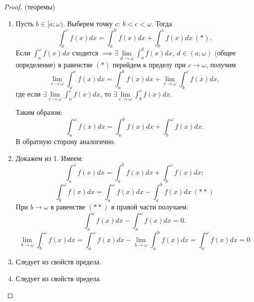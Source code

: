 \documentclass{report}
\theoremstyle{definition}
\begin{document}
\begin{proof}
  (теоремы)

  \begin{enumerate}
    \item Пусть $b \in [a;\omega)$. Выберем точку $c: \ b<c<\omega$. Тогда
          \begin{equation*}
            \int_{a}^{c}f(x)dx = \int_{a}^{b}f(x)dx + \int_{b}^{c}f(x)dx \ (*).
          \end{equation*}
          Если $\int_{a}^{\omega}f(x)dx$ сходится $\implies \exists \underset{d\rightarrow\omega}{\lim}\int_{a}^{d}
            f(x)dx, \ d\in(a;\omega)$ (общее определение) в равенстве $(*)$ перейдем к пределу при $c\rightarrow\omega$,
          получим
          \begin{equation*}
            \underset{c\rightarrow\omega}{\lim}\int_{a}^{c}f(x)dx = \int_{a}^{b}f(x)dx + \underset{c\rightarrow\omega}{\lim}
            \int_{b}^{c}f(x)dx,
          \end{equation*}
          где если $\exists \underset{c\rightarrow\omega}{\lim}\int_{a}^{c}f(x)dx$, то $\exists
            \underset{c\rightarrow\omega}{\lim}\int_{b}^{c}f(x)dx$.

          Таким образом:
          \begin{equation*}
            \int_{a}^{\omega}f(x)dx = \int_{a}^{b}f(x)dx + \int_{b}^{\omega}f(x)dx.
          \end{equation*}
          В обратную сторону аналогично.
    \item Докажем из 1. Имеем:
          \begin{equation*}
            \int_{a}^{\omega}f(x)dx = \int_{a}^{b}f(x)dx + \int_{b}^{\omega}f(x)dx;
          \end{equation*}
          \begin{equation*}
            \int_{b}^{\omega}f(x)dx = \int_{a}^{\omega}f(x)dx - \int_{a}^{b}f(x)dx \ (**)
          \end{equation*}
          При $b\rightarrow\omega$ в равенстве $(**)$ в правой части получаем:
          \begin{equation*}
            \int_{a}^{\omega}f(x)dx - \int_{a}^{\omega}f(x)dx = 0.
          \end{equation*}
          \begin{equation*}
            \underset{b\rightarrow\omega}{\lim}\int_{b}^{\omega}f(x)dx = \int_{a}^{\omega}f(x)dx -
            \underset{b\rightarrow\omega}{\lim}\int_{a}^{b}f(x)dx = \int_{a}^{\omega}f(x)dx = 0
          \end{equation*}
    \item Следует из свойств предела.
    \item Следует из свойств предела.
  \end{enumerate}
\end{proof}
\end{document}
